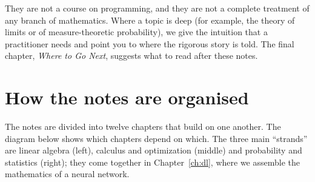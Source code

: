 They are not a course on programming, and they are not a complete treatment of
any branch of mathematics. Where a topic is deep (for example, the theory of
limits or of measure-theoretic probability), we give the intuition that a
practitioner needs and point you to where the rigorous story is told. The
final chapter, \emph{Where to Go Next}, suggests what to read after these
notes.

\section*{How the notes are organised}

The notes are divided into twelve chapters that build on one another. The
diagram below shows which chapters depend on which. The three main
``strands'' are linear algebra (left), calculus and optimization (middle) and
probability and statistics (right); they come together in
Chapter~\ref{ch:dl}, where we assemble the mathematics of a neural network.

